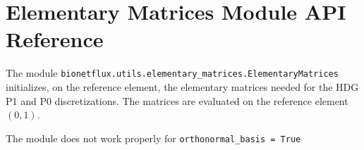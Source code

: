 %

\renewcommand{\vec}[1]{\boldsymbol{#1}}

\section{Elementary Matrices Module API Reference}
\label{sec:elementary_matrices_module_api}

The module \texttt{bionetflux.utils.elementary\_matrices.ElementaryMatrices} initializes, on the reference element, the elementary matrices needed for the HDG P1 and P0 discretizations. The matrices are evaluated on the reference element $(0,1)$.

\begin{warningbox}
The module does not work properly for {\tt orthonormal\_basis = True}
\end{warningbox}


